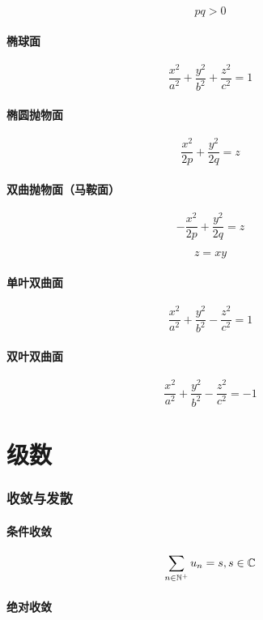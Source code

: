 \documentclass{article}
\begin{document}
\begin{definition}[以下二次曲面方程中都有]
    \[pq>0\]
\end{definition}

\subsection{椭球面}

\[\frac{x^2}{a^2}+\frac{y^2}{b^2}+\frac{z^2}{c^2}=1\]

\subsection{椭圆抛物面}

\[\frac{x^2}{2p}+\frac{y^2}{2q}=z\]

\subsection{双曲抛物面（马鞍面）}

\[-\frac{x^2}{2p}+\frac{y^2}{2q}=z\]

\[z=xy\]

\subsection{单叶双曲面}

\[\frac{x^2}{a^2}+\frac{y^2}{b^2}-\frac{z^2}{c^2}=1\]

\subsection{双叶双曲面}

\[\frac{x^2}{a^2}+\frac{y^2}{b^2}-\frac{z^2}{c^2}=-1\]

\part{级数}

\section{收敛与发散}

\subsection{条件收敛}

\[\sum_{n\in\mathbb N^+}u_n=s,s\in\mathbb C\]

\subsection{绝对收敛}
\end{document}
